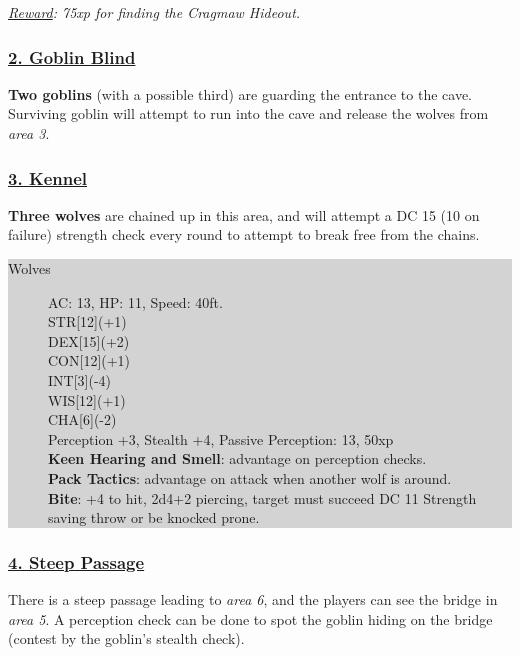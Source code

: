 \emph{\underline{Reward}: 75xp for finding the Cragmaw Hideout.}

\subsubsection*{\underline{2. Goblin Blind}}
\textbf{Two goblins} (with a possible third) are guarding the entrance to the cave. Surviving goblin will attempt to run into the cave and release the wolves from \emph{area 3}.

\subsubsection*{\underline{3. Kennel}}
\textbf{Three wolves} are chained up in this area, and will attempt a DC 15 (10 on failure) strength check every round to attempt to break free from the chains.

\colorbox{lightgray}{\begin{minipage}{0.4\textwidth}
\begin{description}
	\item[Wolves]
	AC: 13, HP: 11, Speed: 40ft.
	\\ STR[12](+1) 
	\\ DEX[15](+2)
	\\ CON[12](+1)
	\\ INT[3](-4)
	\\ WIS[12](+1)
	\\ CHA[6](-2) 
	\\ Perception +3, Stealth +4, Passive Perception: 13, 50xp
	\\ \textbf{Keen Hearing and Smell}: advantage on perception checks.
	\\ \textbf{Pack Tactics}: advantage on attack when another wolf is around.
	\\ \textbf{Bite}: +4 to hit, 2d4+2 piercing, target must succeed DC 11 Strength saving throw or be knocked prone.
\end{description}
\end{minipage}}
\break

\subsubsection*{\underline{4. Steep Passage}}
There is a steep passage leading to \emph{area 6}, and the players can see the bridge in \emph{area 5}. A perception check can be done to spot the goblin hiding on the bridge (contest by the goblin's stealth check).

